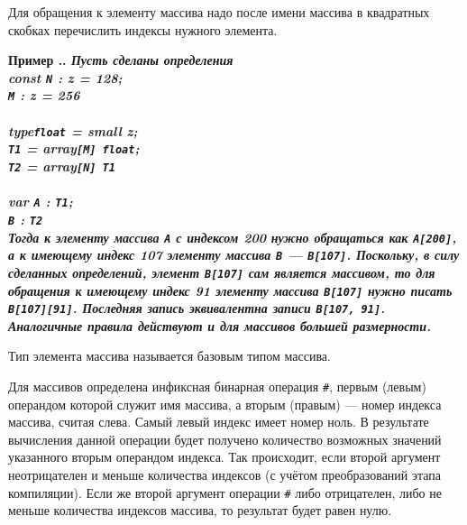 \documentclass[10pt]{report}
\newcounter{exam}[section]
\renewcommand{\theexam}{\thesection.\arabic{exam}}
\newenvironment{Example}{\par\refstepcounter{exam}\bf Пример \theexam. \sl}{\rm\par}
\begin{document}
Для обращения к элементу массива надо после имени массива в квадратных скобках перечислить индексы нужного элемента.

\begin{Example} \textit{Пусть сделаны определения}\\
\rm
\textbf{const} \texttt{N} : \textbf{z} = 128;\\
\hspace*{10mm} \texttt{M} : \textbf{z} = 256\\
\\
\textbf{type}\hspace*{5mm}\texttt{float} = \textbf{small z};\\
\hspace*{12mm}\texttt{T1} = \textbf{array}\texttt{[M] float};\\
\hspace*{12mm}\texttt{T2} = \textbf{array}\texttt{[N] T1}\\
\\
\textbf{var} \texttt{A} : \texttt{T1};\\
\hspace*{11mm} \texttt{B} : \texttt{T2}
\\
\textit{Тогда к элементу массива \texttt{A} с индексом 200 нужно обращаться как \texttt{A[200]}, а к имеющему индекс 107 элементу массива \texttt{B} --- \texttt{B[107]}.
Поскольку, в силу сделанных определений, элемент \texttt{B[107]} сам является массивом, то для обращения к имеющему индекс 91 элементу массива \texttt{B[107]} нужно писать
\texttt{B[107][91]}. Последняя запись эквивалентна записи \texttt{B[107, 91]}. Аналогичные правила действуют и для массивов большей размерности.}
\end{Example}

Тип элемента массива называется базовым типом массива.

Для массивов определена инфиксная бинарная операция \texttt{\#}, первым (левым) операндом которой служит имя массива, а вторым (правым) --- номер индекса массива, считая слева.
Самый левый индекс имеет номер ноль. В результате вычисления данной операции будет получено количество возможных значений указанного вторым операндом индекса. Так происходит,
если второй аргумент неотрицателен и меньше количества индексов (с учётом преобразований этапа компиляции). Если же второй аргумент операции \texttt{\#} либо отрицателен, либо
не меньше количества индексов массива, то результат будет равен нулю.
\end{document}
